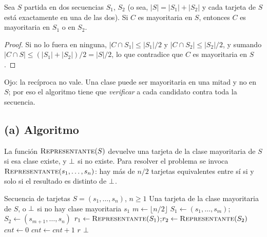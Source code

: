 \begin{lema}[Herencia]\label{l:herencia}
Sea $S$ partida en dos secuencias $S_1$, $S_2$ (o sea, $|S|=|S_1|+|S_2|$ y cada tarjeta
de $S$ está exactamente en una de las dos). Si $C$ es mayoritaria en $S$, entonces $C$ es
mayoritaria en $S_1$ o en $S_2$.
\end{lema}
\begin{proof}
Si no lo fuera en ninguna, $|C\cap S_1|\le|S_1|/2$ y $|C\cap S_2|\le|S_2|/2$, y sumando
$|C\cap S|\le(|S_1|+|S_2|)/2=|S|/2$, lo que contradice que $C$ es mayoritaria en $S$.
\end{proof}

Ojo: la recíproca no vale. Una clase puede ser mayoritaria en una mitad y no en $S$; por
eso el algoritmo tiene que \emph{verificar} a cada candidato contra toda la secuencia.

\subsection*{(a) Algoritmo}

La función $\textsc{Representante}(S)$ devuelve una tarjeta de la clase mayoritaria de $S$
si esa clase existe, y $\bot$ si no existe. Para resolver el problema se invoca
$\textsc{Representante}(s_1,\dots,s_n)$: hay más de $n/2$ tarjetas equivalentes entre sí
si y solo si el resultado es distinto de $\bot$.

\begin{algorithm}[H]
\caption{Representante de la clase mayoritaria}
\begin{algorithmic}[1]
\Require Secuencia de tarjetas $S=(s_1,\dots,s_n)$, $n\ge 1$
\Ensure Una tarjeta de la clase mayoritaria de $S$, o $\bot$ si no hay clase mayoritaria
    \State \Return $s_1$ 
  \EndIf
  \State $m\gets\lfloor n/2\rfloor$
  \State $S_1\gets(s_1,\dots,s_m)$;\quad $S_2\gets(s_{m+1},\dots,s_n)$ 
  \State $r_1\gets\Call{Representante}{S_1}$;\quad $r_2\gets\Call{Representante}{S_2}$
   
    \State $cnt\gets 0$
        \State $cnt\gets cnt+1$
      \EndIf
    \EndFor
      \State \Return $r$
    \EndIf
  \EndFor
  \State \Return $\bot$
\EndFunction
\end{algorithmic}
\end{algorithm}

